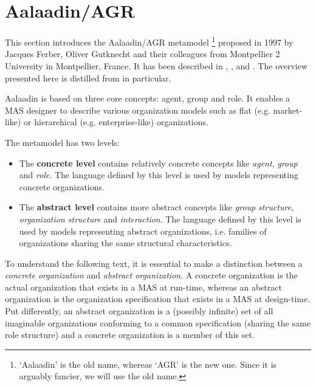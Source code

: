 \section{Aalaadin/AGR}

This section introduces the Aalaadin/AGR metamodel
\footnote{`Aalaadin' is the old name, whereas `AGR' is the new one. Since it is arguably fancier, we will use the old name.}
proposed in 1997 by Jacques Ferber, Oliver Gutknecht and their colleagues from Montpellier 2 University in Montpellier, France.
It has been described in \cite{Ferber97}, \cite{Ferber98}, \cite{Ferber00} and \cite{Ferber03}.
The overview presented here is distilled from \cite{Ferber98} in particular.


Aalaadin is based on three core concepts: agent, group and role.
It enables a MAS designer to describe various organization models such as flat (e.g. market-like) or hierarchical (e.g. enterprise-like) organizations.

The metamodel has two levels:
\begin{itemize}
	\item The \textbf{concrete level} contains relatively concrete concepts like \textit{agent}, \textit{group} and \textit{role}.
	The language defined by this level is used by models representing concrete organizations.
	\item The \textbf{abstract level} contains more abstract concepts like \textit{group structure}, \textit{organization structure} and \textit{interaction}. 
	The language defined by this level is used by models representing abstract organizations, i.e. families of organizations sharing the same structural characteristics.
\end{itemize}

To understand the following text, it is essential to make a distinction between a \textit{concrete organization} and \textit{abstract organization}.
A concrete organization is the actual organization that exists in a MAS at run-time, whereas an abstract organization is the organization specification that exists in a MAS at design-time.
Put differently, an abstract organization is a (possibly infinite) set of all imaginable organizations conforming to a common specification (sharing the same role structure) and a concrete organization is a member of this set.


